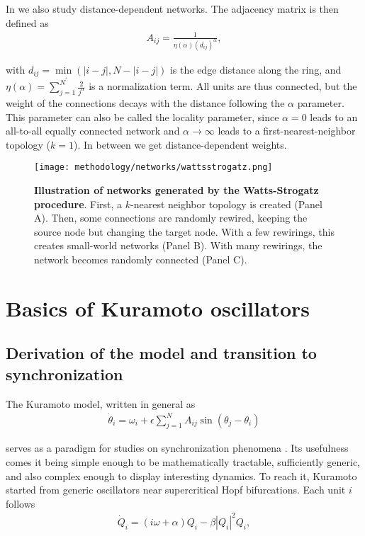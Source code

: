 In  we also study distance-dependent networks. The adjacency matrix is then defined as 
%
\begin{align}
    A_{ij} = \frac{1}{\eta(\alpha)(d_{ij})^\alpha},
\end{align}

with $d_{ij} = \min(|i-j|, N-|i-j|)$ is the edge distance along the ring, and $\eta(\alpha) = \sum_{j=1}^{N^\prime} \frac{2}{j^\alpha}$ is a normalization term. All units are thus connected, but the weight of the connections decays with the distance following the $\alpha$ parameter. This parameter can also be called the locality parameter, since $\alpha=0$ leads to an all-to-all equally connected network and $\alpha\to\infty$ leads to a first-nearest-neighbor topology ($k=1$). In between we get distance-dependent weights.
%
\begin{figure}
    \centering
    \texttt{[image: methodology/networks/wattsstrogatz.png]}
    \caption{\textbf{Illustration of networks generated by the Watts-Strogatz procedure}. First, a $k$-nearest neighbor topology is created (Panel A). Then, some connections are randomly rewired, keeping the source node but changing the target node. With a few rewirings, this creates small-world networks (Panel B). With many rewirings, the network becomes randomly connected (Panel C).}
    \label{method:fig:topology}
\end{figure}


\section{Basics of Kuramoto oscillators}\label{method:sec:kuramoto}
\subsection{Derivation of the model and transition to synchronization}
The Kuramoto model, written in general as 
\begin{align}
    \dot{\theta}_i = \omega_i + \epsilon \sum_{j=1}^N A_{ij} \sin(\theta_j-\theta_i)
    \label{eq:kuramoto-general}
\end{align}

serves as a paradigm for studies on synchronization phenomena \cite{boccaletti2018synchronization}. Its usefulness comes it being simple enough to be mathematically tractable, sufficiently generic, and also complex enough to display interesting dynamics. To reach it, Kuramoto started from generic oscillators near supercritical Hopf bifurcations. Each unit $i$ follows 
\begin{align}
    \dot{Q}_i = (i\omega + \alpha) Q_i - \beta|Q_i|^2 Q_i,
\end{align}

